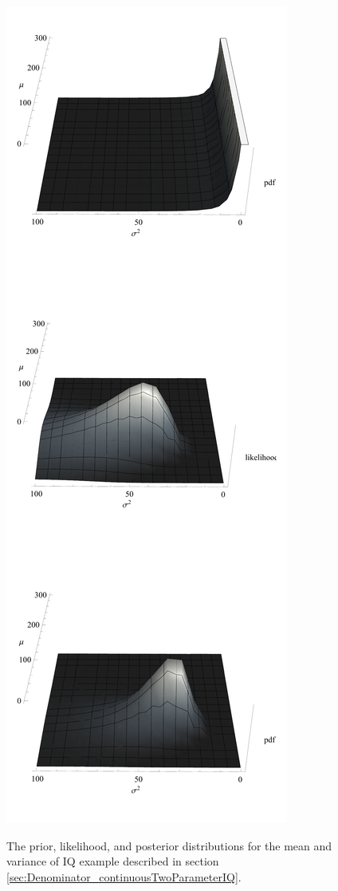 \documentclass[11pt,fullpage]{book}
\begin{document}
\begin{figure}
\centering
\scalebox{0.25} 
{\includegraphics{Denominator_continuousTwoParameter3D.pdf}}\caption{The prior, likelihood, and posterior distributions for the mean and variance of IQ example described in section \ref{sec:Denominator_continuousTwoParameterIQ}.}\label{fig:Denominator_continuousTwoParameter3D}
\end{figure}
\end{document}
